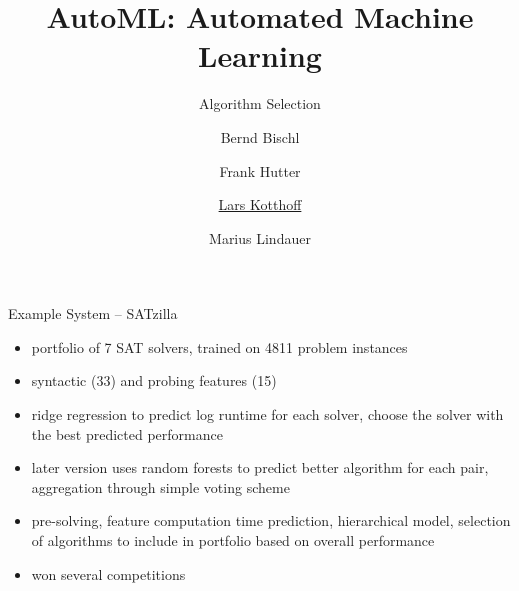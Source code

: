 




\title[AutoML: Overview]{AutoML: Automated Machine Learning}
\subtitle{Algorithm Selection}
\author[Lars Kotthoff]{Bernd Bischl \and Frank Hutter \and \underline{Lars Kotthoff} \and Marius Lindauer}
\institute{}
\date{}





	
	\maketitle
	

\begin{frame}{Example System -- SATzilla}
\begin{itemize}
\item portfolio of 7 SAT solvers, trained on 4811 problem instances
\item syntactic (33) and probing features (15)
\item ridge regression to predict log runtime for each solver, choose the solver with the best predicted performance
\item later version uses random forests to predict better algorithm for each
 pair, aggregation through simple voting scheme
\item pre-solving, feature computation time prediction, hierarchical model,
selection of algorithms to include in portfolio based on overall performance
\item won several competitions
\end{itemize}
\end{frame}

